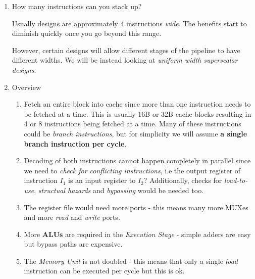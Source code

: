\documentclass[12pt]{article}
\newenvironment{QandA}{\begin{enumerate}[label=\bfseries\arabic*.]\bfseries}
                      {\end{enumerate}}
\newenvironment{answered}{\par\quad\normalfont}{}
\begin{document}
\begin{QandA}
\begin{answered}
\quad We need to ensure that the two instructions are \textit{independent}. This involves \textit{dependency checking} of destination and source registers of the instructions. 
\end{answered}

\item How many instructions can you stack up?
\begin{answered}
Usually designs are approximately 4 instructions \textit{wide}. The benefits start to diminish quickly once you go beyond this range. 

\quad However, certain designs will allow different stages of the pipeline to have different widths. We will be instead looking at \textit{uniform width superscalar designs}. 
\end{answered}

\item Overview
\begin{answered}
\vspace{-0.85cm}
\begin{enumerate}
    \item Fetch an entire block into cache since more than one instruction needs to be fetched at a time. This is usually 16B or 32B cache blocks resulting in 4 or 8 instructions being fetched at a time. Many of these instructions could be \textit{branch instructions}, but for simplicity we will assume \textbf{a single branch instruction per cycle}. 
    \item Decoding of both instructions cannot happen completely in parallel since we need to \textit{check for conflicting instructions}, i.e the output register of instruction $I_{1}$ is an input register to $I_{2}$? Additionally, checks for \textit{load-to-use}, \textit{structual hazards} and \textit{bypassing} would be needed too.
    \item The register file would need more ports - this means many more MUXes and more \textit{read} and \textit{write} ports.
    \item More \textbf{ALUs} are required in the \textit{Execution Stage} - simple adders are easy but bypass paths are expensive.
    \item The \textit{Memory Unit} is not doubled - this means that only a single \textit{load} instruction can be executed per cycle but this is ok. 
\end{enumerate}
\end{answered}


\end{QandA}
\end{document}
